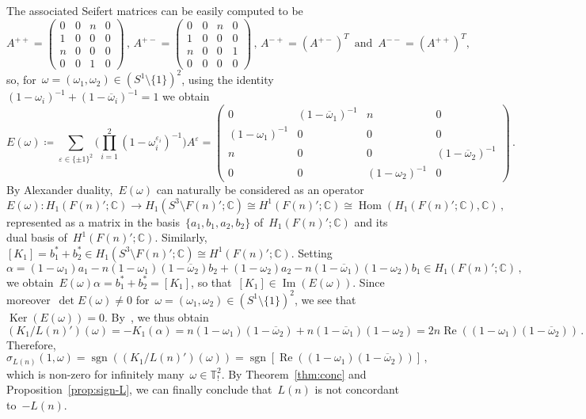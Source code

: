 \documentclass{amsart}
\newcommand{\T}{\mathbb{T}}
\renewcommand{\Re}{\operatorname{Re}}
\newcommand{\sgn}{\operatorname{sgn}}
\newcommand{\om}{\omega}
\newcommand{\bom}{\overline{\omega}}
\theoremstyle{definition}
\theoremstyle{remark}
\begin{document}
The associated Seifert matrices can be easily computed to be
$$ A^{++} = \begin{pmatrix}
	0&0&n&0\\1&0&0&0\\n&0&0&0\\0&0&1&0\end{pmatrix}\,,\, A^{+-} = \begin{pmatrix}
	0&0&n&0\\1&0&0&0\\n&0&0&1\\0&0&0&0\end{pmatrix}\,,\, A^{-+} = (A^{+-})^T\, \text{ and }\,A^{--}=(A^{++})^T,$$
so, for~$\omega = (\omega_1,\omega_2)\in(S^1\setminus\{1\})^2$, using the identity~$(1-\om_i)^{-1}+(1-\bom_i)^{-1} = 1$ we obtain 
$$ E(\omega)\coloneq \sum_{\varepsilon\in\{\pm 1\}^2}\bigg(\prod_{i=1}^2(1-\omega_i^{\varepsilon_i})^{-1}\bigg)A^\varepsilon = \begin{pmatrix}
	0&(1-\bom_1)^{-1}&n&0\\(1-\om_1)^{-1}&0&0&0\\n&0&0&(1-\bom_2)^{-1}\\0&0&(1-\om_2)^{-1}&0\end{pmatrix}\,. $$
By Alexander duality,~$E(\om)$ can naturally be considered as an operator $$E(\om):H_1(F(n)';\mathbb{C})\rightarrow H_1(S^3\setminus F(n)';\mathbb{C})\cong H^1(F(n)';\mathbb{C})\cong \operatorname{Hom}(H_1(F(n)';\mathbb{C}),\mathbb{C})\,,$$
represented as a matrix in the basis~$\{a_1,b_1,a_2,b_2\}$ of~$H_1(F(n)';\mathbb{C})$ and its dual basis of~$H^1(F(n)';\mathbb{C})$. Similarly,~$[K_1] = b_1^*+b_2^* \in H_1(S^3\setminus F(n)';\mathbb{C})\cong H^1(F(n)';\mathbb{C})$. Setting 
$$\alpha = (1-\om_1)a_1 - n(1-\om_1)(1-\bom_2)b_2 + (1-\om_2)a_2 - n(1-\bom_1)(1-\om_2)b_1 \in H_1(F(n)';\mathbb{C})\,,$$
we obtain~$E(\om)\alpha = b_1^*+b_2^* = [K_1]$, so that~$[K_1]\in \operatorname{Im}(E(\om))$. Since moreover~$\operatorname{det}E(\om) \neq 0$ for~$\omega = (\omega_1,\omega_2)\in(S^1\setminus\{1\})^2$, we see that~$\operatorname{Ker}(E(\om)) = 0$. By~\cite[Theorem 4.3]{DFL3}, we thus obtain $$(K_1/L(n)')(\om) = -K_1(\alpha) = n(1-\om_1)(1-\bom_2)+n(1-\bom_1)(1-\om_2) = 2n \Re((1-\om_1)(1-\bom_2))\,.$$
Therefore,
$$\sigma_{L(n)}(1,\om) = \sgn((K_1/L(n)')(\om)) = \sgn[\Re((1-\om_1)(1-\bom_2))]\,,$$ which is non-zero for infinitely many~$\om\in\T^2_!$. By Theorem~\ref{thm:conc} and Proposition~\ref{prop:sign-L}, we can finally conclude that~$L(n)$ is not concordant to~$-L(n)$.
\end{document}
